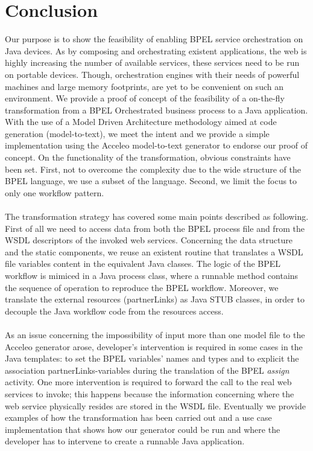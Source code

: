 \section{Conclusion}
\label{Conclusion}
Our purpose is to show the feasibility of enabling BPEL service orchestration on Java devices. As by composing and orchestrating existent applications, the web is highly increasing the number of available services, these services need to be run on portable devices. Though, orchestration engines with their needs of powerful machines and large memory footprints, are yet to be convenient on such an environment.
We provide a proof of concept of the feasibility of a on-the-fly transformation from a BPEL Orchestrated business process to a Java application. 
With the use of a Model Driven Architecture methodology aimed at code generation (model-to-text), we meet the intent and we provide a simple implementation using the Acceleo model-to-text generator to endorse our proof of concept.
On the functionality of the transformation, obvious constraints have been set. First, not to overcome the complexity due to the wide structure of the BPEL language, we use a subset of the language. Second, we limit the focus to only one workflow pattern.

\paragraph{}
The transformation strategy has covered some main points described as following. First of all we need to access data from both the BPEL process file and from the WSDL descriptors of the invoked web services. 
Concerning the data structure and the static components, we reuse an existent routine that translates a WSDL file variables content in the equivalent Java classes. 
The logic of the BPEL workflow is mimiced in a Java process class, where a runnable method contains the sequence of operation to reproduce the BPEL workflow.
Moreover, we translate the external resources (partnerLinks) as Java STUB classes, in order to decouple the Java workflow code from the resources access.

\paragraph{}
As an issue concerning the impossibility of input more than one model file to the Acceleo generator arose, developer's intervention is required in some cases in the Java templates: to set the BPEL variables' names and types and to explicit the association partnerLinks-variables during the translation of the BPEL \textit{assign} activity. One more intervention is required to forward the call to the real web services to invoke; this happens because the information concerning where the web service physically resides are stored in the WSDL file.
Eventually we provide examples of how the transformation has been carried out and a use case implementation that shows how our generator could be run and where the developer has to intervene to create a runnable Java application. 

